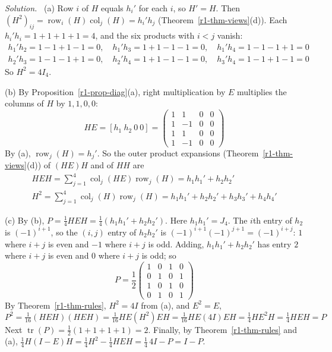\documentclass[12pt]{article}
\DeclareMathOperator{\tr}{tr}
\DeclareMathOperator{\row}{row}
\DeclareMathOperator{\col}{col}
\theoremstyle{definition}
\newenvironment{solution}{\par\noindent\textit{Solution.}\ }{\par\smallskip}
\begin{document}
\begin{solution}
(a) Row \(i\) of \(H\) equals \(h_i'\) for each \(i\), so \(H'=H\). Then
\((H^2)_{ij}=\row_i(H)\col_j(H)=h_i'h_j\) (Theorem~\ref{r1-thm-views}(d)). Each \(h_i'h_i=1+1+1+1=4\), and the six products
with \(i<j\) vanish:
\[
\begin{gathered}
h_1'h_2=1-1+1-1=0,\quad h_1'h_3=1+1-1-1=0,\quad h_1'h_4=1-1-1+1=0\\
h_2'h_3=1-1-1+1=0,\quad h_2'h_4=1+1-1-1=0,\quad h_3'h_4=1-1+1-1=0
\end{gathered}
\]
So \(H^2=4I_4\).

(b) By Proposition~\ref{r1-prop-diag}(a), right multiplication by \(E\) multiplies the columns of \(H\) by
\(1,1,0,0\):
\[
HE=[h_1\ h_2\ 0\ 0]=\begin{pmatrix}1&1&0&0\\1&-1&0&0\\1&1&0&0\\1&-1&0&0\end{pmatrix}
\]
By (a), \(\row_j(H)=h_j'\). So the outer product expansions (Theorem~\ref{r1-thm-views}(d)) of \((HE)H\) and of
\(HH\) are
\[
\begin{gathered}
HEH=\sum_{j=1}^4\col_j(HE)\row_j(H)=h_1h_1'+h_2h_2'\\
H^2=\sum_{j=1}^4\col_j(H)\row_j(H)=h_1h_1'+h_2h_2'+h_3h_3'+h_4h_4'
\end{gathered}
\]

(c) By (b), \(P=\frac14HEH=\frac14(h_1h_1'+h_2h_2')\). Here
\(h_1h_1'=J_4\). The \(i\)th entry of \(h_2\) is \((-1)^{i+1}\), so the \((i,j)\) entry of
\(h_2h_2'\) is \((-1)^{i+1}(-1)^{j+1}=(-1)^{i+j}\): \(1\) where \(i+j\) is even and \(-1\)
where \(i+j\) is odd. Adding, \(h_1h_1'+h_2h_2'\) has entry \(2\) where \(i+j\) is even and
\(0\) where \(i+j\) is odd; so
\[
P=\frac12\begin{pmatrix}1&0&1&0\\0&1&0&1\\1&0&1&0\\0&1&0&1\end{pmatrix}
\]
By Theorem~\ref{r1-thm-rules}, \(H^2=4I\) from (a), and \(E^2=E\),
\[
P^2=\tfrac1{16}(HEH)(HEH)=\tfrac1{16}HE(H^2)EH=\tfrac1{16}HE(4I)EH=\tfrac14HE^2H=\tfrac14HEH=P
\]
Next \(\tr(P)=\frac12(1+1+1+1)=2\). Finally, by Theorem~\ref{r1-thm-rules} and (a),
\(\frac14H(I-E)H=\frac14H^2-\frac14HEH=\frac14\,4I-P=I-P\).
\end{solution}
\end{document}
